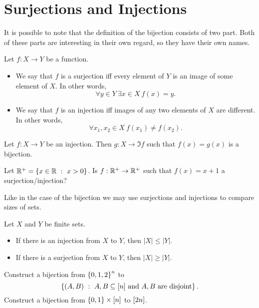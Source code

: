 \section{Surjections and Injections}

It is possible to note that the definition of the bijection consists of two part.
Both of these parts are interesting in their own regard, so they have their own
names.
\begin{definition}
    Let $f : X \to Y$ be a function.
    \begin{itemize}
        \item We say that $f$ is a surjection iff every element of $Y$ is an image
            of some element of $X$. In other words,
            \[
                \forall y \in Y~\exists x \in X\ f(x) = y.
            \]
        \item We say that $f$ is an injection iff images of any two elements
            of $X$ are different. In other words,
            \[
                \forall x_1, x_2 \in X\ f(x_1) \neq f(x_2).
            \]
    \end{itemize}
\end{definition}

\begin{remark}
    Let $f : X \to Y$ be an injection. Then $g : X \to \Im f$ such that
    $f(x) = g(x)$ is a bijection.
\end{remark}

\begin{exercise}
    Let $\R^+ = \set[x > 0]{x \in \R}$. Is $f : {\mathbb{R}}^+ \to {\mathbb{R}}^+$ such that
    $f(x) = x + 1$ a surjection/injection?
\end{exercise}

Like in the case of the bijection we may use surjections and injections to
compare sizes of sets.
\begin{theorem}
\label{theorem:injections-surjections-inequalities}
    Let $X$ and $Y$ be finite sets.
    \begin{itemize}
        \item If there is an injection from $X$ to $Y$, then $|X| \le |Y|$.
        \item If there is a surjection from $X$ to $Y$, then $|X| \ge |Y|$.
    \end{itemize}
\end{theorem}

\begin{chapterendexercises}
    \exercise Construct a bijection from $\set{0, 1, 2}^n$ to
        \[
          \set[{A, B \subseteq \range{n} \text{ and } A, B \text{ are disjoint}}]{(A, B)}.
        \]
    \exercise[recommended] Construct a bijection from
        $\set{0, 1} \times \range{n}$ to ${[{2n}]}$.
\end{chapterendexercises}
